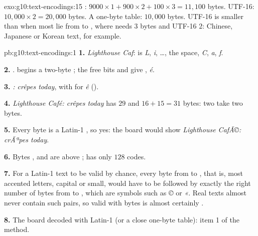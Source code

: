 \begin{solution}{exo:g10:text-encodings:15}
: $9000 \times 1 + 900 \times 2 + 100 \times 3 = 11{,}100$ bytes. UTF-16: $10{,}000 \times 2 = 20{,}000$ bytes.
A one-byte table: $10{,}000$ bytes. UTF-16 is smaller than  when most  lie from  to
, where  needs $3$ bytes and UTF-16 $2$: Chinese, Japanese or Korean text, for example.
\end{solution}

\begin{solution}{pb:g10:text-encodings:1}
\textbf{1.} \textit{Lighthouse Caf}:  is \textit{L},  \textit{i}, \dots,  the space,
 \textit{C},  \textit{a},  \textit{f}.

\textbf{2.} .  begins a two-byte ; the free bits  and  give
, \textit{é}.

\textbf{3.} \textit{: crêpes today}, with  for \textit{ê} ().

\textbf{4.} \textit{Lighthouse Café: crêpes today} has $29$  and $16 + 15 = 31$ bytes: two  take
two bytes.

\textbf{5.} Every byte is a Latin-1 , so yes: the board would show \textit{Lighthouse CafÃ©: crÃªpes today}.

\textbf{6.} Bytes ,  and  are above ;  has only $128$ codes.

\textbf{7.} For a Latin-1 text to be valid  by chance, every byte from  to , that is, most
accented letters, capital or small, would have to be followed by exactly the right number of bytes from  to
, which are symbols such as \textit{©} or \textit{«}. Real texts almost never contain such pairs, so valid
 with  bytes is almost certainly .

\textbf{8.} The board decoded with Latin-1 (or a close one-byte table): item 1 of the method.


\end{solution}
